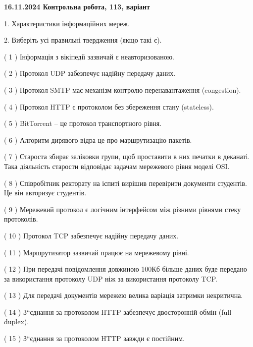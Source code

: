\documentclass[12pt, ukrainian]{article}
\begin{document}
\vspace{4mm}
\newpage
\begin {large}

\textbf{16.11.2024 Контрольна робота, 113, варіант  }\par


{
1. Характеристики інформаційних мереж.



\vspace{5mm}
2. Виберіть усі правильні твердження (якщо такі є).\par
\vspace{2mm}

( 1 ) Інформація з вікіпедії зазвичай є неавторизованою.

( 2 ) Протокол UDP забезпечує надійну передачу даних.

( 3 ) Протокол SMTP має механізм контролю перенавантаження (congestion).

( 4 ) Протокол  HTTP є протоколом без збереження стану (stateless).

( 5 ) BitTorrent – це протокол транспортного рівня.

( 6 ) Алгоритм дирявого відра це про маршрутизацію пакетів.

( 7 ) Староста збирає заліковки групи, щоб проставити в них печатки в деканаті. Така діяльність старости відповідає задачам мережевого рівня моделі OSI.

( 8 ) Співробітник ректорату на іспиті вирішив перевірити документи студентів. Це він авторизує студентів.

( 9 ) Мережевий протокол є логічним інтерфейсом між різними рівнями стеку протоколів.

( 10 ) Протокол TCP забезпечує надійну передачу даних.

( 11 ) Маршрутизатор зазвичай працює на мережевому рівні.

( 12 ) При передачі повідомлення довжиною 100Кб більше даних буде передано за використання протоколу UDP ніж за використання протоколу TCP.

( 13 ) Для передачі документів мережею велика варіація затримки некритична.

( 14 ) З“єднання за протоколом  HTTP забезпечує двосторонній обмін (full duplex).

( 15 ) З“єднання за протоколом  HTTP завжди є постійним.
}
\end {large}
\end{document}

